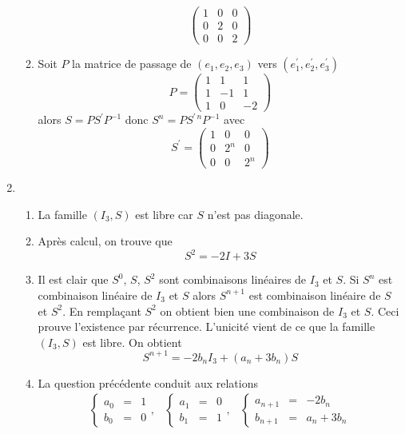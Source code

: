 \begin{enumerate}
\begin{enumerate}
\[\left( \begin{array}{ccc}
1 & 0 & 0 \\
0 & 2 & 0 \\
0 & 0 & 2
        \end{array}\right)\]
\item Soit $P$ la matrice de passage de $(e_1,e_2,e_3)$ vers $(e^{\prime}_1,e^{\prime}_2,e^{\prime}_3)$
\[P=\left( \begin{array}{ccc}
1 & 1 & 1 \\
1 & -1 & 1 \\
1 & 0 & -2
        \end{array}\right)\]
alors $S=PS^{\prime}P^{-1}$ donc $S^{n}=PS^{\prime \, n}P^{-1}$ avec
\[S^{\prime}=
\left( \begin{array}{ccc}
1 & 0 & 0 \\
0 & 2^n & 0 \\
0 & 0 & 2^n
        \end{array}\right)\] 
\end{enumerate}
\item \begin{enumerate}
 \item La famille $(I_3,S)$ est libre car $S$ n'est pas diagonale.
\item Après calcul, on trouve que
\[S^2=-2I + 3S\]
\item Il est clair que $S^0$, $S$, $S^2$ sont combinaisons linéaires de $I_3$ et $S$. Si $S^n$ est combinaison linéaire de $I_3$ et $S$ alors $S^{n+1}$ est combinaison linéaire de $S$ et $S^2$. En remplaçant $S^2$ on obtient bien une combinaison de $I_3$ et $S$. Ceci prouve l'existence par récurrence. L'unicité vient de ce que la famille $(I_3,S)$ est libre. On obtient 
\[S^{n+1}=-2b_nI_3 + (a_n+3b_n)S\]
\item La question précédente conduit aux relations
\begin{eqnarray*}
 \left\lbrace \begin{array}{lcl}
a_0 &=& 1\\
b_0 &=& 0 
              \end{array}\right.
,&
 \left\lbrace \begin{array}{lcl}
a_1 &=& 0\\
b_1 &=& 1
              \end{array}\right.
,&
\left\lbrace \begin{array}{lcl}
a_{n+1} &=& -2b_n\\
b_{n+1} &=& a_n + 3b_n
              \end{array}\right.
\end{eqnarray*}

\end{enumerate}
\end{enumerate}
